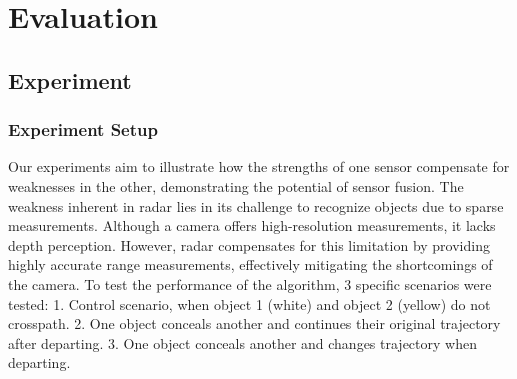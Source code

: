 
\chapter{Evaluation}\label{sec:evalutaion}
\section{Experiment }\label{sec:3-experiment}
\subsection{Experiment Setup}\label{sec:3-setup}
Our experiments aim to illustrate how the strengths of one sensor compensate for weaknesses in the other, 
demonstrating the potential of sensor fusion.
The weakness inherent in radar lies in its challenge to recognize objects due to sparse measurements. 
Although a camera offers high-resolution measurements, 
it lacks depth perception. 
However, radar compensates for this limitation by providing highly accurate range measurements, 
effectively mitigating the shortcomings of the camera.
To test the performance of the algorithm, 3 specific scenarios were tested:
1. Control scenario, when object 1 (white) and object 2 (yellow) do not crosspath.
2. One object conceals another and continues their original trajectory after departing.
3. One object conceals another and changes trajectory when departing.
